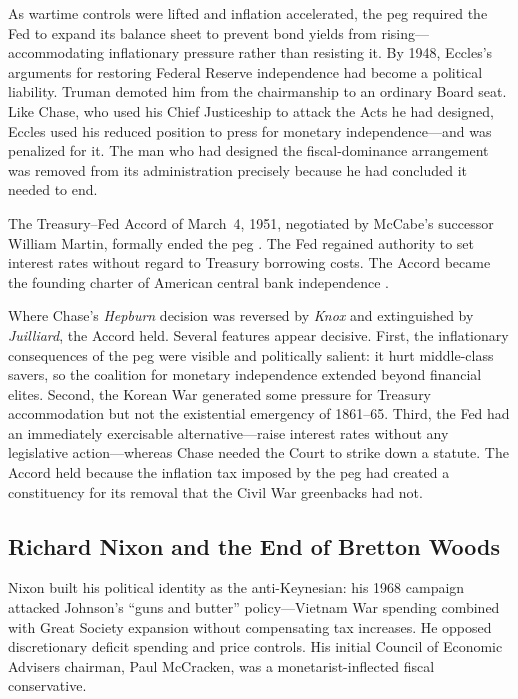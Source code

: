 \documentclass[12pt]{article}
\begin{document}
As wartime controls were lifted and inflation accelerated, the peg
required the Fed to expand its balance sheet to prevent bond yields
from rising---accommodating inflationary pressure rather than resisting
it.  By 1948, Eccles's arguments for restoring Federal Reserve
independence had become a political liability.  Truman demoted him from
the chairmanship to an ordinary Board seat.  Like Chase, who used his
Chief Justiceship to attack the Acts he had designed, Eccles used his
reduced position to press for monetary independence---and was penalized
for it.  The man who had designed the fiscal-dominance arrangement was
removed from its administration precisely because he had concluded it
needed to end.

The Treasury--Fed Accord of March~4, 1951, negotiated by McCabe's
successor William Martin, formally ended the peg \citep{HetzelLeach2001}.
The Fed regained authority to set interest rates without regard to
Treasury borrowing costs.  The Accord became the founding charter of
American central bank independence \citep{Meltzer2003}.

Where Chase's \textit{Hepburn} decision was reversed by \textit{Knox}
and extinguished by \textit{Juilliard}, the Accord held.  Several
features appear decisive.  First, the inflationary consequences of the
peg were visible and politically salient: it hurt middle-class savers,
so the coalition for monetary independence extended beyond financial
elites.  Second, the Korean War generated some pressure for Treasury
accommodation but not the existential emergency of 1861--65.  Third,
the Fed had an immediately exercisable alternative---raise interest
rates without any legislative action---whereas Chase needed the Court to
strike down a statute.  The Accord held because the inflation tax imposed
by the peg had created a constituency for its removal that the Civil War
greenbacks had not.

\subsection{Richard Nixon and the End of Bretton Woods}

Nixon built his political identity as the anti-Keynesian: his 1968
campaign attacked Johnson's ``guns and butter'' policy---Vietnam War
spending combined with Great Society expansion without compensating tax
increases.  He opposed discretionary deficit spending and price controls.
His initial Council of Economic Advisers chairman, Paul McCracken, was a
monetarist-inflected fiscal conservative.
\end{document}
